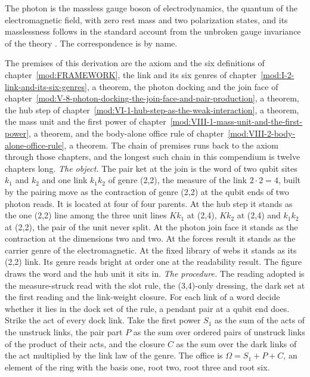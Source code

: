 \begin{chbridge}
The photon is the massless gauge boson of electrodynamics, the quantum of the electromagnetic field, with zero rest mass and two polarization states, and its masslessness follows in the standard account from the unbroken gauge invariance of the theory \cite{Peskin1995,Weinberg1995}. The correspondence is by name.
\end{chbridge}
\begin{chproof}
The premises of this derivation are the axiom and the six definitions of chapter~\ref{mod:FRAMEWORK}, the link and its six genres of chapter~\ref{mod:I-2-link-and-its-six-genres}, a theorem, the photon docking and the join face of chapter~\ref{mod:V-8-photon-docking-the-join-face-and-pair-production}, a theorem, the hub step of chapter~\ref{mod:VI-1-hub-step-as-the-weak-interaction}, a theorem, the mass unit and the first power of chapter~\ref{mod:VIII-1-mass-unit-and-the-first-power}, a theorem, and the body-alone office rule of chapter~\ref{mod:VIII-2-body-alone-office-rule}, a theorem. The chain of premises runs back to the axiom through those chapters, and the longest such chain in this compendium is twelve chapters long.
\textit{The object.} The pair ket at the join is the word of two qubit sites $k_1$ and $k_2$ and one link $k_1k_2$ of genre (2,2), the measure of the link $2\cdot 2=4$, built by the pairing move as the contraction of genre (2,2) at the qubit ends of two photon reads. It is located at four of four parents. At the hub step it stands as the one (2,2) line among the three unit lines $Kk_1$ at (2,4), $Kk_2$ at (2,4) and $k_1k_2$ at (2,2), the pair of the unit never split. At the photon join face it stands as the contraction at the dimensions two and two. At the forces result it stands as the carrier genre of the electromagnetic. At the fixed library of webs it stands as its (2,2) link. Its genre reads bright at order one at the readability result. The figure draws the word and the hub unit it sits in.
\textit{The procedure.} The reading adopted is the measure-struck read with the slot rule, the (3,4)-only dressing, the dark set at the first reading and the link-weight closure. For each link of a word decide whether it lies in the dock set of the rule, a pendant pair at a qubit end does. Strike the act of every dock link. Take the first power $S_1$ as the sum of the acts of the unstruck links, the pair part $P$ as the sum over ordered pairs of unstruck links of the product of their acts, and the closure $C$ as the sum over the dark links of the act multiplied by the link law of the genre. The office is $\Omega = S_1 + P + C$, an element of the ring with the basis one, root two, root three and root six.

\end{chproof}
